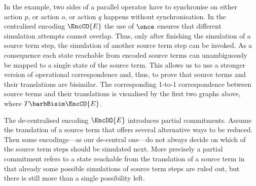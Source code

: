 \documentclass[]{eptcs}
\begin{document}
  \begin{minipage}[c]{0.4\textwidth-2pt}
  \end{minipage}

  In the example, two sides of a parallel operator have to synchronise on either action $p$, or action $o$, or action $q$ happens without synchronisation.
  In the centralised encoding $\EncCO{E}$ the use of $ \once $ ensures that different simulation attempts cannot overlap. Thus, only after finishing the simulation of a source term step, the simulation of another source term step can be invoked. As a consequence each state reachable from encoded source terms can unambiguously be mapped to a single state of the source term. This allows us to use a stronger version of operational correspondence and, thus, to prove that source terms and their translations are bisimilar. The corresponding 1-to-1 correspondence between source terms and their translations is visualised by the first two graphs above, where $ T \barbBisim \EncCO{E} $.

  The de-centralised encoding $\EncDO{E}$ introduces partial commitments.
  Assume the translation of a source term that offers several alternative ways to be reduced. Then some encodings---as our de-central one---do not always decide on which of the source term steps should be simulated next. More precisely a partial commitment refers to a state reachable from the translation of a source term in that already some possible simulations of source term steps are ruled out, but there is still more than a single possibility left.
\end{document}
